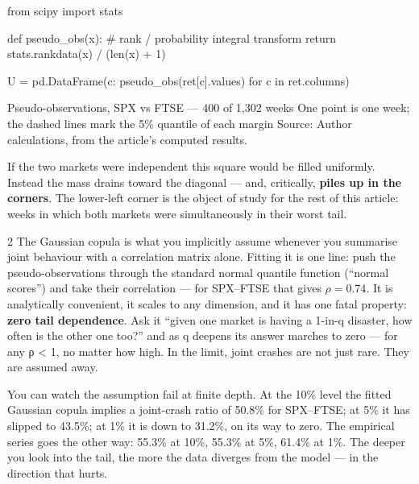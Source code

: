\documentclass{pyportfolios-note}
\begin{document}
\begin{notecode}
from scipy import stats

def pseudo_obs(x):                       # rank / probability integral transform
    return stats.rankdata(x) / (len(x) + 1)

U = pd.DataFrame({c: pseudo_obs(ret[c].values) for c in ret.columns})
\end{notecode}

  {Pseudo-observations, SPX vs FTSE — 400 of 1,302 weeks}
  {One point is one week; the dashed lines mark the 5\% quantile of each margin}
  {Source: Author calculations, from the article's computed results.}

If the two markets were independent this square would be filled uniformly.
Instead the mass drains toward the diagonal — and, critically, \textbf{piles up
in the corners}. The lower-left corner is the object of study for the rest of
this article: weeks in which both markets were simultaneously in their worst
tail.

\noteneedroom{190bp}

\begin{multicols}{2}
The Gaussian copula is what you implicitly assume whenever you summarise joint
behaviour with a correlation matrix alone. Fitting it is one line: push the
pseudo-observations through the standard normal quantile function (``normal
scores'') and take their correlation — for SPX–FTSE that gives $\rho = 0.74$. It
is analytically convenient, it scales to any dimension, and it has one fatal
property: \textbf{zero tail dependence}. Ask it ``given one market is having a
1-in-q disaster, how often is the other one too?'' and as q deepens its answer
marches to zero — for any ρ < 1, no matter how high. In the limit, joint crashes
are not just rare. They are assumed away.

You can watch the assumption fail at finite depth. At the 10\% level the fitted
Gaussian copula implies a joint-crash ratio of 50.8\% for SPX–FTSE; at 5\% it has
slipped to 43.5\%; at 1\% it is down to 31.2\%, on its way to zero. The empirical
series goes the other way: 55.3\% at 10\%, 55.3\% at 5\%, 61.4\% at 1\%. The
deeper you look into the tail, the more the data diverges from the model — in the
direction that hurts.
\end{multicols}
\end{document}
